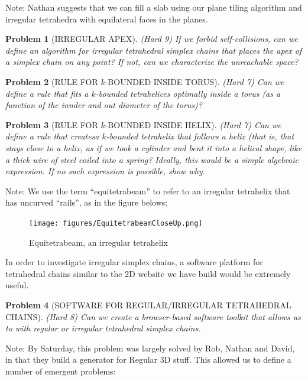 \documentclass[11pt]{article}
\newtheorem{problem}{Problem}
\begin{document}
Note: Nathan suggests that we can fill a slab using our plane tiling algorithm and irregular tetrahedra with equilateral faces in the planes.

\begin{problem}[IRREGULAR APEX]
  (Hard 9) If we forbid self-collisions, can we define an algorithm for irregular tetrahedral simplex chains that places the apex
  of a simplex chain on any point? If not, can we characterize the unreachable space?
\end{problem}

\begin{problem}[RULE FOR $k$-BOUNDED INSIDE TORUS]
(Hard 7) Can we define a rule that fits a $k$-bounded tetrahelices optimally inside a torus (as a function of the innder and out diameter of the torus)?  
\end{problem}

\begin{problem}[RULE FOR $k$-BOUNDED INSIDE HELIX]
\item (Hard 7) Can we define a rule that createsa $k$-bounded tetrahelix that follows a helix (that is, that stays close to a helix, as if we took a cylinder and bent it into a helical shape, like a thick wire of
steel coiled into a spring? Ideally, this would be a simple algebraic expression. If no such expression is possible, show why.
\end{problem}

Note: We use the term ``equitetrabeam'' to refer to an irregular tetrahelix that has uncurved ``rails'', as in the figure belows:

\begin{figure}
     \centering
     \texttt{[image: figures/EquitetrabeamCloseUp.png]}
     \caption{Equitetrabeam, an irregular tetrahelix}
  \label{fig:equitetrabeam}
\end{figure}

In order to investigate irregular simplex chains, a software platform for tetrahedral chains similar to the 2D website we have build would be
extremely useful.

\begin{problem}[SOFTWARE FOR REGULAR/IRREGULAR TETRAHEDRAL CHAINS]
(Hard 8) Can we create a browser-based software toolkit that allows us to with regular or irregular tetrahedral simplex chains.  
\end{problem}

Note: By Saturday, this problem was largely solved by Rob, Nathan and David, in that they build a generator for Regular 3D stuff. This allowed us to define a number of emergent problems:
\end{document}
